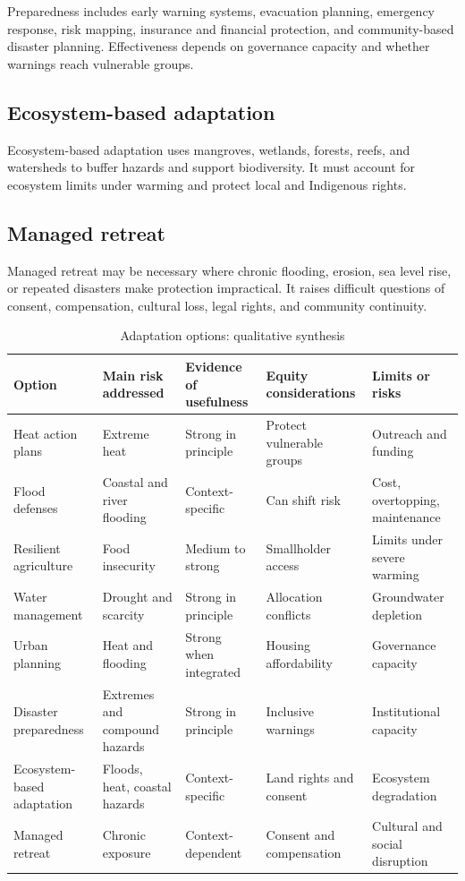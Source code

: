 \documentclass[12pt]{article}
\begin{document}
Preparedness includes early warning systems, evacuation planning, emergency response, risk mapping, insurance and financial protection, and community-based disaster planning. Effectiveness depends on governance capacity and whether warnings reach vulnerable groups.

\subsection{Ecosystem-based adaptation}

Ecosystem-based adaptation uses mangroves, wetlands, forests, reefs, and watersheds to buffer hazards and support biodiversity. It must account for ecosystem limits under warming and protect local and Indigenous rights.

\subsection{Managed retreat}

Managed retreat may be necessary where chronic flooding, erosion, sea level rise, or repeated disasters make protection impractical. It raises difficult questions of consent, compensation, cultural loss, legal rights, and community continuity.

\begin{table}[htbp]
\centering
\caption{Adaptation options: qualitative synthesis}
\begin{tabularx}{\textwidth}{p{3cm}p{3cm}p{3cm}Y Y}
\toprule
Option & Main risk addressed & Evidence of usefulness & Equity considerations & Limits or risks \\
\midrule
Heat action plans & Extreme heat & Strong in principle & Protect vulnerable groups & Outreach and funding \\
Flood defenses & Coastal and river flooding & Context-specific & Can shift risk & Cost, overtopping, maintenance \\
Resilient agriculture & Food insecurity & Medium to strong & Smallholder access & Limits under severe warming \\
Water management & Drought and scarcity & Strong in principle & Allocation conflicts & Groundwater depletion \\
Urban planning & Heat and flooding & Strong when integrated & Housing affordability & Governance capacity \\
Disaster preparedness & Extremes and compound hazards & Strong in principle & Inclusive warnings & Institutional capacity \\
Ecosystem-based adaptation & Floods, heat, coastal hazards & Context-specific & Land rights and consent & Ecosystem degradation \\
Managed retreat & Chronic exposure & Context-dependent & Consent and compensation & Cultural and social disruption \\
\bottomrule
\end{tabularx}
\end{table}
\end{document}
